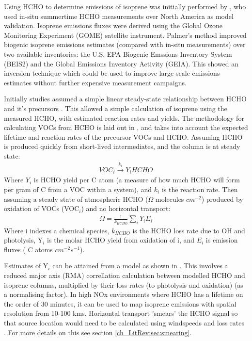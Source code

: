 	    Using HCHO to determine emissions of isoprene was initially performed by \cite{Palmer2001, Palmer2003}, who used in-situ summertime HCHO measurements over North America as model validation.
	    Isoprene emissions fluxes were derived using the Global Ozone Monitoring Experiment (GOME) satellite instrument.
	    Palmer's method improved biogenic isoprene emissions estimates (compared with in-situ measurements) over two available inventories: the U.S. EPA Biogenic Emssions Inventory System (BEIS2) and the Global Emissions Inventory Activity (GEIA).
	    This showed an inversion technique which could be used to improve large scale emissions estimates without further expensive measurement campaigns.
	    
	    Initially studies assumed a simple linear steady-state relationship between HCHO and it's precursors \citep{Palmer2003, Palmer2006, Millet2006}.
	    This allowed a simple calculation of isoprene using the measured HCHO, with estimated reaction rates and yields.
	    The methodology for calculating VOCs from HCHO is laid out in \citet{Palmer2003}, and takes into account the expected lifetime and reaction rates of the precursor VOCs and HCHO.
	    Assuming HCHO is produced quickly from short-lived intermediates, and the column is at steady state:
	    \begin{eqnarray*}
	    VOC_i \overset{k_i}{\rightarrow} Y_i HCHO
	    \end{eqnarray*}
	    Where $Y_i$ is HCHO yield per C atom (a measure of how much HCHO will form per gram of C from a VOC within a system), and $k_i$ is the reaction rate.
	    Then assuming a steady state of atmospheric HCHO ($\Omega$ molecules $cm^{-2}$) produced by oxidation of VOCs (VOC$_i$) and no horizontal transport:
	    \begin{eqnarray*}
	    \Omega = \frac{1}{k_{HCHO}} \sum_{i} Y_i E_i
	    \end{eqnarray*}
	    Where i indexes a chemical species, $k_{HCHO}$ is the HCHO loss rate due to OH and photolysis, Y$_i$ is the molar HCHO yield from oxidation of i, and $E_i$ is emission fluxes ( C atoms $cm^{-2}s^{-1}$).
	    
	    Estimates of Y$_i$ can be attained from a model as shown in \citet{Millet2006}.
	    This involves a reduced major axis (RMA) correllation calculation between modelled HCHO and isoprene columns, multiplied by their loss rates (to photolysis and oxidation) (as a normalising factor).  
	    In high NOx environments where HCHO has a lifetime on the order of 30 minutes, it can be used to map isoprene emissions with spatial resolution from 10-100 kms.
	    Horizontal transport 'smears' the HCHO signal so that source location would need to be calculated using windspeeds and loss rates \citep{Palmer2001,Palmer2003}.
	    For more details on this see section \ref{ch_LitRev:sec:smearing}.
	    
